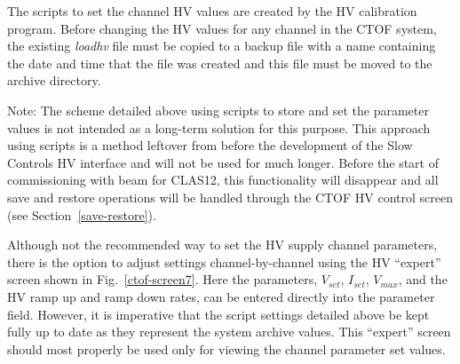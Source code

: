 \documentclass[12pt]{article}
\begin{document}
The scripts to set the channel HV values are created by the HV calibration program. Before 
changing the HV values for any channel in the CTOF system, the existing {\it loadhv} file 
must be copied to a backup file with a name containing the date and time that the file was 
created and this file must be moved to the archive directory.

Note: The scheme detailed above using scripts to store and set the parameter values is not 
intended as a long-term solution for this purpose. This approach using scripts is a method 
leftover from before the development of the Slow Controls HV interface and will not be used 
for much longer. Before the start of commissioning with beam for CLAS12, this functionality 
will disappear and all save and restore operations will be handled through the CTOF HV control 
screen (see Section~\ref{save-restore}).

Although not the recommended way to set the HV supply channel parameters, there is the option 
to adjust settings channel-by-channel using the HV ``expert'' screen shown in 
Fig.~\ref{ctof-screen7}. Here the parameters, $V_{set}$, $I_{set}$, $V_{max}$, and the HV ramp 
up and ramp down rates, can be entered directly into the parameter field. However, it is 
imperative that the script settings detailed above be kept fully up to date as they represent 
the system archive values. This ``expert'' screen should most properly be used only for viewing 
the channel parameter set values.
\end{document}
